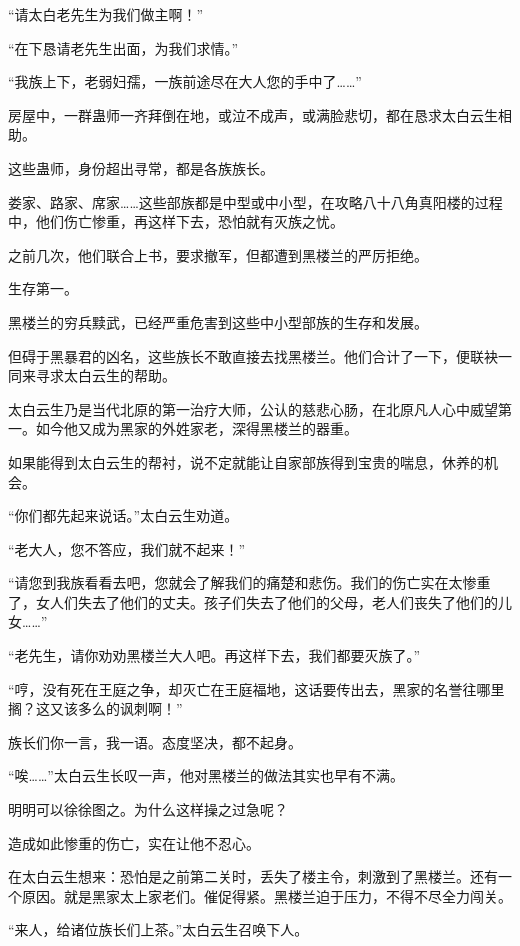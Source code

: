 
\begin{this_body}

“请太白老先生为我们做主啊！”

“在下恳请老先生出面，为我们求情。”

“我族上下，老弱妇孺，一族前途尽在大人您的手中了……”

房屋中，一群蛊师一齐拜倒在地，或泣不成声，或满脸悲切，都在恳求太白云生相助。

这些蛊师，身份超出寻常，都是各族族长。

娄家、路家、席家……这些部族都是中型或中小型，在攻略八十八角真阳楼的过程中，他们伤亡惨重，再这样下去，恐怕就有灭族之忧。

之前几次，他们联合上书，要求撤军，但都遭到黑楼兰的严厉拒绝。

生存第一。

黑楼兰的穷兵黩武，已经严重危害到这些中小型部族的生存和发展。

但碍于黑暴君的凶名，这些族长不敢直接去找黑楼兰。他们合计了一下，便联袂一同来寻求太白云生的帮助。

太白云生乃是当代北原的第一治疗大师，公认的慈悲心肠，在北原凡人心中威望第一。如今他又成为黑家的外姓家老，深得黑楼兰的器重。

如果能得到太白云生的帮衬，说不定就能让自家部族得到宝贵的喘息，休养的机会。

“你们都先起来说话。”太白云生劝道。

“老大人，您不答应，我们就不起来！”

“请您到我族看看去吧，您就会了解我们的痛楚和悲伤。我们的伤亡实在太惨重了，女人们失去了他们的丈夫。孩子们失去了他们的父母，老人们丧失了他们的儿女……”

“老先生，请你劝劝黑楼兰大人吧。再这样下去，我们都要灭族了。”

“哼，没有死在王庭之争，却灭亡在王庭福地，这话要传出去，黑家的名誉往哪里搁？这又该多么的讽刺啊！”

族长们你一言，我一语。态度坚决，都不起身。

“唉……”太白云生长叹一声，他对黑楼兰的做法其实也早有不满。

明明可以徐徐图之。为什么这样操之过急呢？

造成如此惨重的伤亡，实在让他不忍心。

在太白云生想来：恐怕是之前第二关时，丢失了楼主令，刺激到了黑楼兰。还有一个原因。就是黑家太上家老们。催促得紧。黑楼兰迫于压力，不得不尽全力闯关。

“来人，给诸位族长们上茶。”太白云生召唤下人。


\end{this_body}
